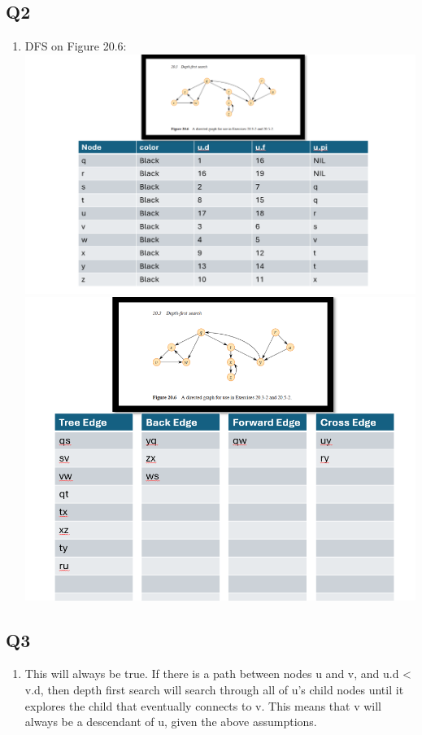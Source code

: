 \documentclass{article}
\begin{document}
\subsection*{Q2}
\begin{enumerate}[label=(\alph*)]
    \item DFS on Figure 20.6:
    \subitem \includegraphics[width=1\textwidth]{dfs20.6.png}
    \subitem \includegraphics[width=1\textwidth]{classifications.png}
\end{enumerate}

\subsection*{Q3}
\begin{enumerate}[label=(\alph*)]
    \item This will always be true. If there is a path between nodes u and v, and u.d < v.d, then depth first search will search through all of u's child nodes until it explores the child that eventually connects to v. This means that v will always be a descendant of u, given the above assumptions.
\end{enumerate}
\end{document}

